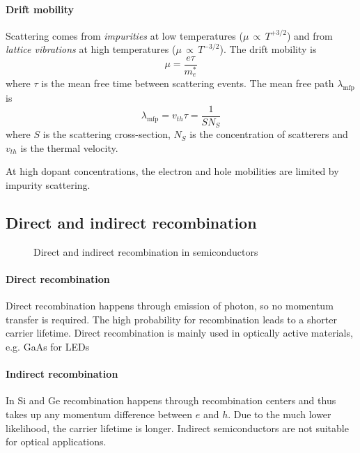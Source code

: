 \paragraph{Drift mobility}
Scattering comes from \emph{impurities} at low temperatures 
($\mu \,\propto\, T^{+3/2}$) 
and from \emph{lattice vibrations} at high temperatures 
($\mu \,\propto\, T^{-3/2}$).
The drift mobility is 
\begin{equation}
    \mu = \frac{e \tau}{m_e^*}
\end{equation}
where $\tau$ is the mean free time between scattering events.
The mean free path $\lambda_{\textrm{mfp}}$ is
\begin{equation}
    \lambda_{\textrm{mfp}} = v_{th} \tau = \frac{1}{S N_S}
\end{equation}
where $S$ is the scattering cross-section, $N_S$ is the concentration of scatterers
and $v_{th}$ is the thermal velocity.

At high dopant concentrations, the electron and hole mobilities are limited
by impurity scattering.

\subsection{Direct and indirect recombination}
\begin{figure}[ht!]
    \centering
    
    \caption{Direct and indirect recombination in semiconductors}
\end{figure}
\begin{multicols}{2}
    \paragraph{Direct recombination} 
    Direct recombination happens through emission of photon,
    so no momentum transfer is required. 
    The high probability for recombination leads to a shorter carrier lifetime.
    Direct recombination is mainly used in optically active materials, e.g. GaAs for LEDs
    
    \paragraph{Indirect recombination}
    In Si and Ge recombination happens through recombination centers and thus
    takes up any momentum difference between $e$ and $h$.
    Due to the much lower likelihood, the carrier lifetime is longer.
    Indirect semiconductors are not suitable for optical applications.
\end{multicols}

